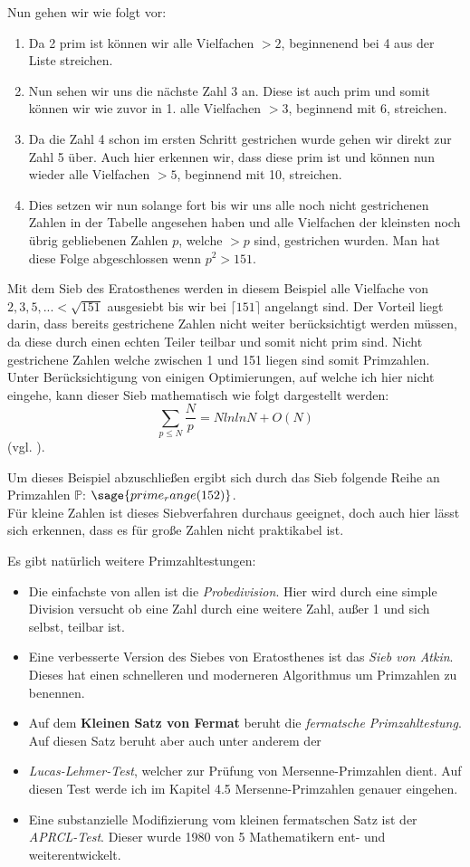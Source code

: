 \documentclass[german,12pt,a4paper]{article}
\begin{document}
Nun gehen wir wie folgt vor:
\begin{enumerate}
    \item Da 2 prim ist können wir alle Vielfachen $>2$, beginnenend bei 4 aus der Liste streichen.
    \item Nun sehen wir uns die nächste Zahl 3 an. Diese ist auch prim und somit können wir wie zuvor in 1. alle Vielfachen $>3$, beginnend mit 6, streichen.
    \item Da die Zahl 4 schon im ersten Schritt gestrichen wurde gehen wir direkt zur Zahl 5 über. Auch hier erkennen wir, dass diese prim ist und können nun wieder alle Vielfachen $>5$, beginnend mit 10, streichen.
    \item Dies setzen wir nun solange fort bis wir uns alle noch nicht gestrichenen Zahlen in der Tabelle angesehen haben und alle Vielfachen der kleinsten noch übrig gebliebenen Zahlen $p$, welche $>p$ sind, gestrichen wurden. Man hat diese Folge abgeschlossen wenn $p^2 > 151$. 
\end{enumerate}
Mit dem Sieb des Eratosthenes werden in diesem Beispiel alle Vielfache von $2, 3, 5, ... < \sqrt{151}$ ausgesiebt bis wir bei $\lceil151\rceil$ angelangt sind. Der Vorteil liegt darin, dass bereits gestrichene Zahlen nicht weiter berücksichtigt werden müssen, da diese durch einen echten Teiler teilbar und somit nicht prim sind. Nicht gestrichene Zahlen welche zwischen 1 und 151 liegen sind somit Primzahlen. Unter Berücksichtigung von einigen Optimierungen, auf welche ich hier nicht eingehe, kann dieser Sieb mathematisch wie folgt dargestellt werden:
\[\sum_{p\le N} \frac{N}p = N ln ln N + O(N)\]
(vgl. \cite[121]{Crandall2005}).

Um dieses Beispiel abzuschließen ergibt sich durch das Sieb folgende Reihe an Primzahlen $\mathbb{P}$: $\sage{prime_range(152)}$.\\
Für kleine Zahlen ist dieses Siebverfahren durchaus geeignet, doch auch hier lässt sich erkennen, dass es für große Zahlen nicht praktikabel ist.

Es gibt natürlich weitere Primzahltestungen:
\begin{itemize}
    \item Die einfachste von allen ist die \textit{Probedivision}. Hier wird durch eine simple Division versucht ob eine Zahl durch eine weitere Zahl, außer 1 und sich selbst, teilbar ist.
    \item Eine verbesserte Version des Siebes von Eratosthenes ist das \textit{Sieb von Atkin}. Dieses hat einen schnelleren und moderneren Algorithmus um Primzahlen zu benennen.
    \item Auf dem \textbf{Kleinen Satz von Fermat} beruht die \textit{fermatsche Primzahltestung}. Auf diesen Satz beruht aber auch unter anderem der
    \item \textit{Lucas-Lehmer-Test}, welcher zur Prüfung von Mersenne-Primzahlen dient. Auf diesen Test werde ich im Kapitel 4.5 Mersenne-Primzahlen genauer eingehen.
    \item Eine substanzielle Modifizierung vom kleinen fermatschen Satz ist der \textit{APRCL-Test}. Dieser wurde 1980 von 5 Mathematikern ent- und weiterentwickelt.
\end{itemize}
\end{document}
